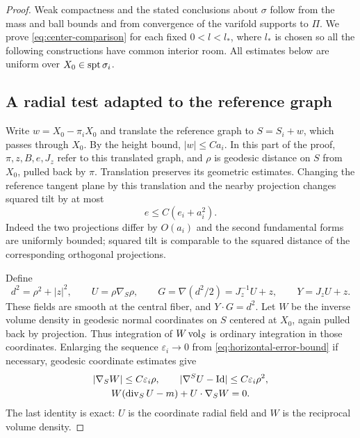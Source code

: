 \begin{proof}
Weak compactness and the stated conclusions about $\sigma$ follow from
the mass and ball bounds and from convergence of the varifold supports
to $\Pi$. We prove \eqref{eq:center-comparison} for each fixed
$0<l<l_*$, where $l_*$ is chosen so all the following constructions
have common interior room. All estimates below are uniform over
$X_0\in\operatorname{spt}\sigma_i$.

\subsection*{A radial test adapted to the reference graph}

Write $w=X_0-\pi_iX_0$ and translate the reference graph to
$S=S_i+w$, which passes through $X_0$. By the height bound,
$|w|\le Ca_i$. In this part of the proof, $\pi,z,B,e,J_z$ refer to this
translated graph, and $\rho$ is geodesic distance on $S$ from $X_0$,
pulled back by $\pi$. Translation preserves its geometric estimates.
Changing the reference tangent plane by this translation and the nearby
projection changes squared tilt by at most
\begin{equation}\label{eq:translated-tilt}
                  e\le C(e_i+a_i^2).
\end{equation}
Indeed the two projections differ by $O(a_i)$ and the second fundamental
forms are uniformly bounded; squared tilt is comparable to the squared
distance of the corresponding orthogonal projections.

Define
\[
 d^2=\rho^2+|z|^2,\qquad
 U=\rho\nabla_S\rho,\qquad
 G=\nabla(d^2/2)=J_z^{-1}U+z,\qquad Y=J_zU+z.
\]
These fields are smooth at the central fiber, and
$Y\cdot G=d^2$. Let $W$ be the inverse volume density in geodesic
normal coordinates on $S$ centered at $X_0$, again pulled back by
projection. Thus integration of $W\operatorname{vol}_S$ is ordinary integration in
those coordinates. Enlarging the sequence $\varepsilon_i\to0$ from
\eqref{eq:horizontal-error-bound} if necessary, geodesic coordinate
estimates give
\begin{equation}\label{eq:geodesic-compensation}
\begin{gathered}
 |\nabla_S W|\le C\varepsilon_i\rho,
 \qquad |\nabla^S U-\mathrm{Id}|\le C\varepsilon_i\rho^2,\\
 W(\operatorname{div}_SU-m)+U\cdot\nabla_SW=0.
\end{gathered}
\end{equation}
The last identity is exact: $U$ is the coordinate radial field and $W$
is the reciprocal volume density.


\end{proof}
